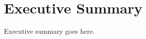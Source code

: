 \documentclass[11pt]{article}
\begin{document}
\section*{Executive Summary}
Executive summary goes here.

\newpage
\tableofcontents
\listoffigures
\listoftables

\newpage












\newpage




\end{document}
